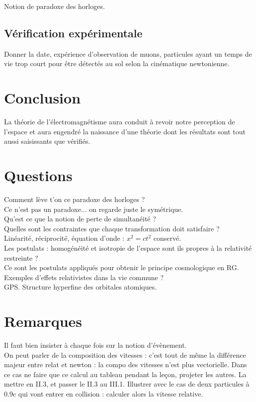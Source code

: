 \documentclass[12pt,prb,aps,epsf]{article}
\begin{document}
Notion de paradoxe des horloges.

\subsection{Vérification expérimentale}
Donner la date, expérience d'observation de muons, particules ayant un temps de vie trop court pour être détectés au sol selon la cinématique newtonienne.

\section*{Conclusion}
La théorie de l'électromagnétisme aura conduit à revoir notre perception de l'espace et aura engendré la naissance d'une théorie dont les résultats sont tout aussi saisissants que vérifiés.

\section*{Questions}
Comment lève t'on ce paradoxe des horloges ?\\
Ce n'est pas un paradoxe... on regarde juste le symétrique.\\

Qu'est ce que la notion de perte de simultanéité ?\\

Quelles sont les contraintes que chaque transformation doit satisfaire ?\\
Linéarité, réciprocité, équation d'onde :  $x^2 = ct^2$ conservé.\\

Les postulats : homogénéité et isotropie de l'espace sont ils propres à la relativité restreinte ?\\
Ce sont les postulats appliqués pour obtenir le principe cosmologique en RG.\\

Exemples d'effets relativistes dans la vie commune ?\\
GPS. Structure hyperfine des orbitales atomiques. 



\section*{Remarques}
Il faut bien insister à chaque fois sur la notion d'évènement.\\
On peut parler de la composition des vitesses : c'est tout de même la différence majeur entre relat et newton : la compo des vitesses n'est plus vectorielle. Dans ce cas ne faire que ce calcul au tableau pendant la leçon, projeter les autres. La mettre en II.3, et passer le II.3 au III.1. Illustrer avec le cas de deux particules à 0.9c qui vont entrer en collision : calculer alors la vitesse relative.\\
\end{document}
